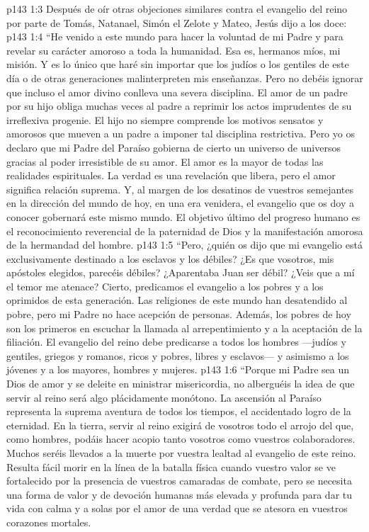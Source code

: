\vs p143 1:3 Después de oír otras objeciones similares contra el evangelio del reino por parte de Tomás, Natanael, Simón el Zelote y Mateo, Jesús dijo a los doce:
\vs p143 1:4 “He venido a este mundo para hacer la voluntad de mi Padre y para revelar su carácter amoroso a toda la humanidad. Esa es, hermanos míos, mi misión. Y es lo único que haré sin importar que los judíos o los gentiles de este día o de otras generaciones malinterpreten mis enseñanzas. Pero no debéis ignorar que incluso el amor divino conlleva una severa disciplina. El amor de un padre por su hijo obliga muchas veces al padre a reprimir los actos imprudentes de su irreflexiva progenie. El hijo no siempre comprende los motivos sensatos y amorosos que mueven a un padre a imponer tal disciplina restrictiva. Pero yo os declaro que mi Padre del Paraíso gobierna de cierto un universo de universos gracias al poder irresistible de su amor. El amor es la mayor de todas las realidades espirituales. La verdad es una revelación que libera, pero el amor significa relación suprema. Y, al margen de los desatinos de vuestros semejantes en la dirección del mundo de hoy, en una era venidera, el evangelio que os doy a conocer gobernará este mismo mundo. El objetivo último del progreso humano es el reconocimiento reverencial de la paternidad de Dios y la manifestación amorosa de la hermandad del hombre.
\vs p143 1:5 “Pero, ¿quién os dijo que mi evangelio está exclusivamente destinado a los esclavos y los débiles? ¿Es que vosotros, mis apóstoles elegidos, parecéis débiles? ¿Aparentaba Juan ser débil? ¿Veis que a mí el temor me atenace? Cierto, predicamos el evangelio a los pobres y a los oprimidos de esta generación. Las religiones de este mundo han desatendido al pobre, pero mi Padre no hace acepción de personas. Además, los pobres de hoy son los primeros en escuchar la llamada al arrepentimiento y a la aceptación de la filiación. El evangelio del reino debe predicarse a todos los hombres ---judíos y gentiles, griegos y romanos, ricos y pobres, libres y esclavos--- y asimismo a los jóvenes y a los mayores, hombres y mujeres.
\vs p143 1:6 “Porque mi Padre sea un Dios de amor y se deleite en ministrar misericordia, no alberguéis la idea de que servir al reino será algo plácidamente monótono. La ascensión al Paraíso representa la suprema aventura de todos los tiempos, el accidentado logro de la eternidad. En la tierra, servir al reino exigirá de vosotros todo el arrojo del que, como hombres, podáis hacer acopio tanto vosotros como vuestros colaboradores. Muchos seréis llevados a la muerte por vuestra lealtad al evangelio de este reino. Resulta fácil morir en la línea de la batalla física cuando vuestro valor se ve fortalecido por la presencia de vuestros camaradas de combate, pero se necesita una forma de valor y de devoción humanas más elevada y profunda para dar tu vida con calma y a solas por el amor de una verdad que se atesora en vuestros corazones mortales.
